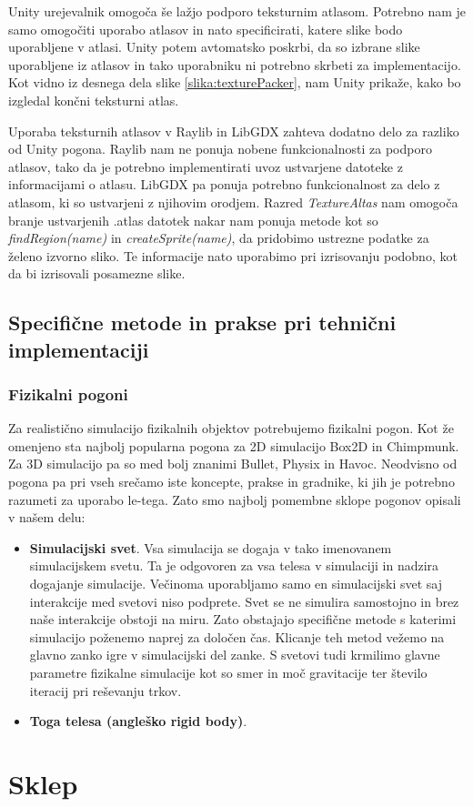 \documentclass[12pt,a4paper,twoside]{book}
\begin{document}
Unity urejevalnik omogoča še lažjo podporo teksturnim atlasom. Potrebno nam je samo omogočiti uporabo atlasov in nato specificirati, katere slike bodo uporabljene v atlasi. Unity potem avtomatsko poskrbi, da so izbrane slike uporabljene iz atlasov in tako uporabniku ni potrebno skrbeti za implementacijo. Kot vidno iz desnega dela slike \ref{slika:texturePacker}, nam Unity prikaže, kako bo izgledal končni teksturni atlas.

Uporaba teksturnih atlasov v Raylib in LibGDX zahteva dodatno delo za razliko od Unity pogona. Raylib nam ne ponuja nobene funkcionalnosti za podporo atlasov, tako da je potrebno implementirati uvoz ustvarjene datoteke z informacijami o atlasu. LibGDX pa ponuja potrebno funkcionalnost za delo z atlasom, ki so ustvarjeni z njihovim orodjem. Razred \textit{TextureAltas} nam omogoča branje ustvarjenih .atlas datotek nakar nam ponuja metode kot so \textit{findRegion(name)} in \textit{createSprite(name)}, da pridobimo ustrezne podatke za želeno izvorno sliko. Te informacije nato uporabimo pri izrisovanju podobno, kot da bi izrisovali posamezne slike. 

\section{Specifične metode in prakse pri tehnični implementaciji}
\subsection{Fizikalni pogoni}
Za realistično simulacijo fizikalnih objektov potrebujemo fizikalni pogon. Kot že omenjeno sta najbolj popularna pogona za 2D simulacijo Box2D in Chimpmunk. Za 3D simulacijo pa so med bolj znanimi Bullet, Physix in Havoc. Neodvisno od pogona pa pri vseh srečamo iste koncepte, prakse in gradnike, ki jih je potrebno razumeti za uporabo le-tega. Zato smo najbolj pomembne sklope pogonov opisali v našem delu:
\begin{itemize}
	\item \textbf{Simulacijski svet}.  Vsa simulacija se dogaja v tako imenovanem simulacijskem svetu. Ta je odgovoren za vsa telesa v simulaciji in nadzira dogajanje simulacije. Večinoma uporabljamo samo en simulacijski svet saj interakcije med svetovi niso podprete. Svet se ne simulira samostojno in brez naše interakcije obstoji na miru. Zato obstajajo specifične metode s katerimi simulacijo poženemo naprej za določen čas. Klicanje teh metod vežemo na glavno zanko igre v simulacijski del zanke. S svetovi tudi krmilimo glavne parametre fizikalne simulacije kot so smer in moč gravitacije ter število iteracij pri reševanju trkov.
	\item \textbf{Toga telesa (angleško rigid body)}.
\end{itemize}

\chapter{Sklep}\thispagestyle{fancy}

\cleardoublepage


\end{document}
